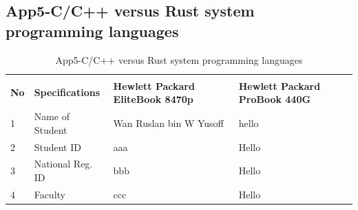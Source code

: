\begin{landscape}
	\subsection{App5-C/C++ versus Rust system programming languages}
	
	\begin{table}[ht]
		\begin{center}
			\caption{App5-C/C++ versus Rust system programming languages}		
			\label{tabl2:App5-C/C++ versus Rust system programming languages}	
			
			\begin{tabular}{ |p{0.5cm}|p{5.0cm}|p{9.0cm}|p{9.0cm}|}
				\rowcolor{gray!10}			
				\hline \multicolumn{4}{|c|}{\textbf{C/C++ versus Rust system programming languages}} \\ [1.0ex]
				\rowcolor{gray!10}
				\hline \textbf{No} & \textbf{Specifications}    & \textbf{Hewlett Packard EliteBook 8470p} & \textbf{Hewlett Packard ProBook 440G}\\ 
				
				\hline 1 & Name of Student    & Wan Ruslan bin W Yusoff & hello\\ 
				\hline 2 & Student ID         &  aaa & Hello\\ 
				\hline 3 & National Reg. ID   & bbb  & Hello\\ 
				\hline 4 & Faculty            & ccc  & Hello\\ 
				
				\hline
			\end{tabular}
		\end{center}
	\end{table}  
	
\end{landscape}
